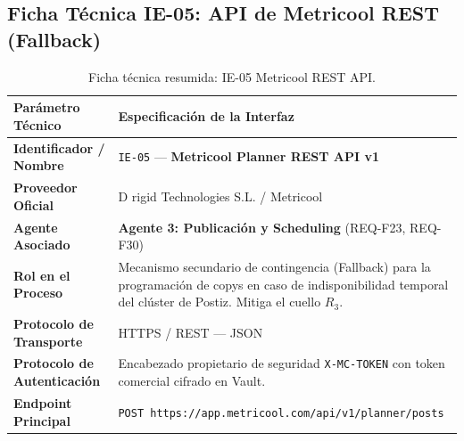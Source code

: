 \documentclass[11pt,a4paper]{article}
\begin{document}
\subsection{Ficha Técnica IE-05: API de Metricool REST (Fallback)}\label{sec:ie05}
\begin{table}[h!]
\centering
\small
\begin{tabular}{p{4.5cm} p{11cm}}
\toprule
\textbf{Parámetro Técnico} & \textbf{Especificación de la Interfaz} \\
\midrule
\textbf{Identificador / Nombre} & \texttt{IE-05} --- \textbf{Metricool Planner REST API v1} \\
\textbf{Proveedor Oficial} & D rigid Technologies S.L. / Metricool \\
\textbf{Agente Asociado} & \textbf{Agente 3: Publicación y Scheduling} (REQ-F23, REQ-F30) \\
\textbf{Rol en el Proceso} & Mecanismo secundario de contingencia (Fallback) para la programación de copys en caso de indisponibilidad temporal del clúster de Postiz. Mitiga el cuello $R_3$. \\
\textbf{Protocolo de Transporte} & HTTPS / REST --- JSON \\
\textbf{Protocolo de Autenticación} & Encabezado propietario de seguridad \texttt{X-MC-TOKEN} con token comercial cifrado en Vault. \\
\textbf{Endpoint Principal} & \texttt{POST https://app.metricool.com/api/v1/planner/posts} \\
\bottomrule
\end{tabular}
\caption{Ficha técnica resumida: IE-05 Metricool REST API.}
\end{table}
\end{document}
